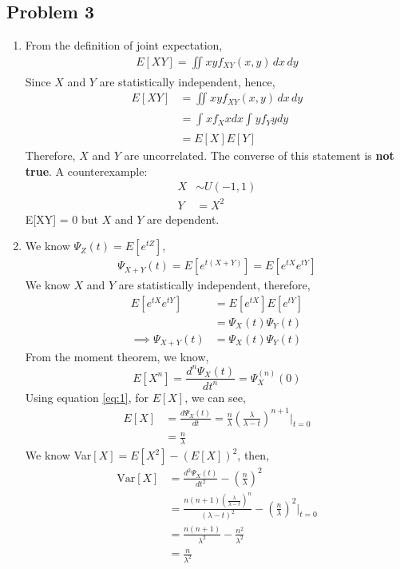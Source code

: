 \documentclass{article}
\begin{document}
	\subsection*{Problem 3}
		\begin{enumerate}
			\item From the definition of joint expectation,
				\begin{align*}
					E[XY] = \iint_{}xyf_{XY}(x,y) \,dx\,dy
				\end{align*}
				Since $X$ and $Y$ are statistically independent, hence,
				\begin{align*}
					E[XY] &= \iint_{}xyf_{XY}(x,y) \,dx\,dy \\
					&= \int_{}^{}xf_X{x}dx \int_{}^{}yf_Y{y}dy \\
					&= E[X]E[Y]
				\end{align*}
				Therefore, $X$ and $Y$ are uncorrelated. The converse of this statement is
				\textbf{not true}. A counterexample:
				\begin{align*}
					X & \sim \mathrm{\textit{U}}(-1,1) \\
					Y &= X^2
				\end{align*}
				E[XY] = 0 but $X$ and $Y$ are dependent.
			\item We know $\Psi_{Z}(t) = E[e^{tZ}]$,
				\begin{align*}
					\Psi_{X+Y}(t) = E[e^{t(X+Y)}] = E[e^{tX}e^{tY}]
				\end{align*}
				We know $X$ and $Y$ are statistically independent, therefore,
				\begin{align*}
					E[e^{tX}e^{tY}] &= E[e^{tX}]E[e^{tY}] \\
					&= \Psi_{X}(t)\Psi_{Y}(t) \\
					\implies \Psi_{X+Y}(t) &= \Psi_{X}(t)\Psi_{Y}(t)
				\end{align*}
				From the moment theorem, we know,
				\begin{equation}
					E[X^n] = \frac{d^n\Psi_{X}(t)}{dt^n} = \Psi_{X}^{(n)}(0)
					\label{eq:1}
				\end{equation}
				Using equation \ref{eq:1}, for $E[X]$, we can see,
				\begin{align*}
					E[X] &= \frac{d\Psi_{X}(t)}{dt} = \frac{n}{\lambda}\left(\frac{\lambda}{\lambda-t}\right)^{n+1} \bigg|_{t=0} \\
					&= \frac{n}{\lambda}
				\end{align*}
				We know Var$[X] = E[X^2] - \left(E[X]\right)^2$, then,
				\begin{align*}
					\mathrm{Var}[X] &= \frac{d^2\Psi_{X}(t)}{dt^2} - \left(\frac{n}{\lambda}\right)^2 \\
					&= \frac{n(n+1)\left(\frac{\lambda}{\lambda-t}\right)^n}{\left(\lambda-t\right)^2} - \left(\frac{n}{\lambda}\right)^2 \bigg|_{t=0} \\
					&= \frac{n(n+1)}{\lambda^2} - \frac{n^2}{\lambda^2} \\
					&= \frac{n}{\lambda^2}
				\end{align*}
		\end{enumerate}
\end{document}
